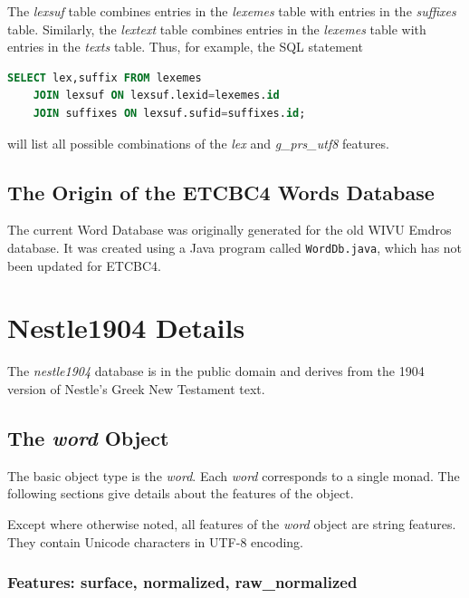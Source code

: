 \documentclass[11pt,oneside,a4paper]{memoir}
\begin{document}
The \emph{lexsuf} table combines entries in the \emph{lexemes} table with entries in the
\emph{suffixes} table. Similarly, the \emph{lextext} table combines entries in the \emph{lexemes}
table with entries in the \emph{texts} table. Thus, for example, the SQL statement

\begin{lstlisting}[language=SQL]
SELECT lex,suffix FROM lexemes
    JOIN lexsuf ON lexsuf.lexid=lexemes.id
    JOIN suffixes ON lexsuf.sufid=suffixes.id;
\end{lstlisting}

\noindent
will list all possible combinations of the \emph{lex} and \emph{g\_prs\_utf8} features.

\section{The Origin of the ETCBC4 Words Database}

The current Word Database was originally generated for the old WIVU Emdros database. It was created
using a Java program called \texttt{WordDb.java}, which has not been updated for ETCBC4.


\chapter{Nestle1904 Details}\label{app-nestle}

The \emph{nestle1904} database is in the public domain and derives from the 1904 version of Nestle's
Greek New Testament text.

\section{The \emph{word} Object}

The basic object type is the \emph{word}. Each \emph{word} corresponds to a single monad. The following
sections give details about the features of the object.

Except where otherwise noted, all features of the \emph{word} object are string features. They
contain Unicode characters in UTF-8 encoding.

\subsection{Features: surface, normalized, raw\_normalized}
\end{document}
